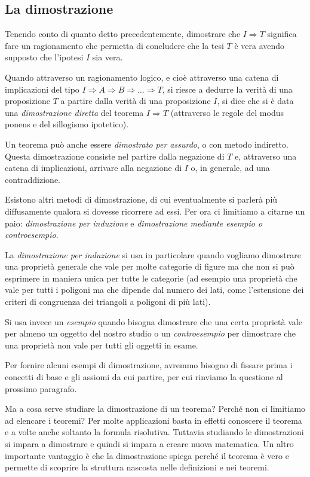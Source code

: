 \subsection{La dimostrazione}

Tenendo conto di quanto detto precedentemente, dimostrare che $I\Rightarrow T$ significa fare un ragionamento che permetta di concludere che la tesi $T$ è vera avendo supposto che l'ipotesi $I$ sia vera.

Quando attraverso un ragionamento logico, e cioè attraverso una catena di implicazioni del tipo  $I\Rightarrow A\Rightarrow B\Rightarrow \ldots{} \Rightarrow T$, si riesce a dedurre la verità di una proposizione $T$ a partire dalla verità di una proposizione $I$, si dice che si è data una \emph{dimostrazione diretta} del teorema $I\Rightarrow T$ (attraverso le regole del modus ponens e del sillogismo ipotetico).

Un teorema può anche essere \emph{dimostrato per assurdo}, o con metodo indiretto. Questa dimostrazione consiste nel partire dalla negazione di $T$ e, attraverso una catena di implicazioni, arrivare alla negazione di $I$ o, in generale, ad una contraddizione.

Esistono altri metodi di dimostrazione, di cui eventualmente si parlerà più diffusamente qualora si dovesse ricorrere ad essi. Per ora ci limitiamo a citarne un paio: \emph{dimostrazione per induzione} e \emph{dimostrazione mediante esempio o controesempio}.

La \emph{dimostrazione per induzione} si usa in particolare quando vogliamo dimostrare una proprietà generale che vale per molte categorie di figure ma che non si può esprimere in maniera unica per tutte le categorie (ad esempio una proprietà che vale per tutti i poligoni ma che dipende dal numero dei lati, come l'estensione dei criteri di congruenza dei triangoli a poligoni di più lati).

Si usa invece un \emph{esempio} quando bisogna dimostrare che una certa proprietà vale per almeno un oggetto del nostro studio o un \emph{controesempio} per dimostrare che una proprietà non vale per tutti gli oggetti in esame.

Per fornire alcuni esempi di dimostrazione, avremmo bisogno di fissare prima i concetti di base e gli assiomi da cui partire, per cui rinviamo la questione al prossimo paragrafo.

Ma a cosa serve studiare la dimostrazione di un teorema? Perché non ci limitiamo ad elencare i teoremi? Per molte applicazioni basta in effetti conoscere il teorema e a volte anche soltanto la formula risolutiva. Tuttavia studiando le dimostrazioni si impara a dimostrare e quindi si impara a creare nuova matematica. Un altro importante vantaggio è che la dimostrazione spiega perché il teorema è vero e permette di scoprire la struttura nascosta nelle definizioni e nei teoremi.

